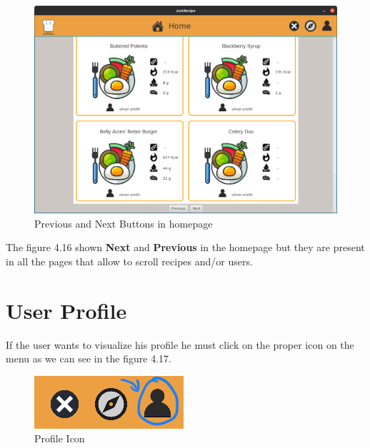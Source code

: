 \documentclass[a4paper]{report}
\begin{document}
\begin{figure}[htpb]
	\centering
	\includegraphics[scale=0.35]{img/user_manual/previousbutton.png}
	\caption{Previous and Next Buttons in homepage}
\end{figure}



\newpage
\noindent The figure 4.16 shown \textbf{Next} and \textbf{Previous} in the homepage but they are present in all the pages that allow to scroll recipes and/or users.
\newpage

\section{User Profile}
\noindent If the user wants to visualize his profile he must click on the proper icon on the menu as we can see in the figure 4.17.

\begin{figure}[htpb]
	\centering
	\includegraphics[scale=0.36]{img/user_manual/profile-icon.png}
	\caption{Profile Icon}
\end{figure}
\end{document}
